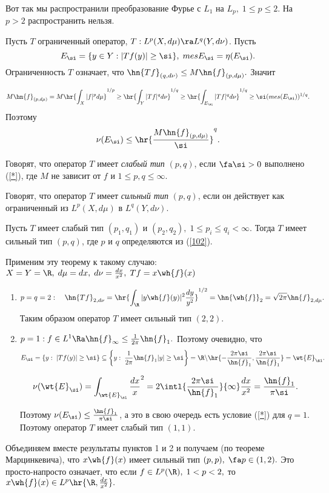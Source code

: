 \documentclass[a4paper]{article}
\begin{document}
Вот так мы распространили преобразование Фурье с $L_1$ на $L_p,\;1\le p \le 2$. На $p>2$ распространить
нельзя.

Пусть $T$ ограниченный оператор, $T:L^p(X,d\mu)\ra L^q(Y,d\nu)$. Пусть
$$E_{\si}=\{y\in Y:|Tf(y)|\ge\si\},\;mes E_{\si}=\eta(E_{\si}).$$ Ограниченность $T$ означает, что
$\hn{Tf}_{(q,d\nu)}\le M\hn{f}_{(p,d\mu)}.$ Значит

$$M\hn{f}_{(p,d\mu)}=M\hr{\int_X |f|^pd\mu}^{1/p}\ge \hr{\int_Y |Tf|^qd\nu}^{1/q}\ge
\hr{\int_{E_{\si}} |Tf|^qd\nu}^{1/q}\ge\si(mes(E_{\si}))^{1/q}.$$ Поэтому
\begin{equation}\label{*}
\nu(E_{\si})\le\hr{\frac{M\hn{f}_{(p,d\mu)}}{\si}}^q.
\end{equation}

\begin{df}
  Говорят, что оператор $T$ имеет \emph{слабый тип} $(p,q)$, если $\fa\si>0$
  выполнено (\ref{*}), где $M$ не зависит от $f$ и $1\le p,q\le\infty.$
\end{df}

\begin{df}
  Говорят, что оператор $T$ имеет \emph{сильный тип} $(p,q)$, если он действует как
  ограниченный из $L^p(X,d\mu)$ в $L^q(Y,d\nu).$
\end{df}

\begin{theorem}[Марцинкевич] Пусть $T$ имеет слабый тип
$(p_1,q_1)$ и $(p_2,q_2),\;1\le p_i\le q_i<\infty$. Тогда $T$ имеет сильный тип $(p,q)$, где $p$ и $q$
определяются из (\ref{102}).
\end{theorem}

Применим эту теорему к такому случаю: $X=Y=\R ,\;d\mu=dx,\;d\nu=\frac{dx}{x^2},\;Tf=x\wh{f}(x)$
\begin{enumerate}
\item
$$p=q=2:\quad\hn{Tf}_{2,d\nu}=\hr{\int_{\R }|y\wh{f}(y)|^2\frac{dy}{y^2}}^{1/2}=\hn{\wh{f}}_2=\sqrt{2\pi}\hn{f}_{2,d\mu}.$$
Таким образом оператор $T$ имеет сильный тип $(2,2).$
\item
$p=1: f\in L^1\Ra\hn{f}_{\infty}\le\frac1{2\pi}\hn{f}_1.$ Поэтому очевидно, что
$$E_{\si}=\{y:\;|Tf(y)|\ge\si\}\subseteq\left\{y:\;\frac1{2\pi}\hn{f}_1|y|\ge\si\right\}=\R \backslash\hr{-\frac{2\pi\si}{\hn{f}_1},\frac{2\pi\si}{\hn{f}_1}}=\wt{E}_{\si}.$$

$$\nu(\wt{E}_{\si})=\int_{\wt{E}_{\si}}\frac{dx}x^2=2\intl{\frac{2\pi\si}{\hn{f}_1}}{\infty}\frac{dx}{x^2}=\frac{\hn{f}_1}{\pi\si}.$$

Поэтому $\nu(E_{\si})\le\frac{\hn{f}_1}{\pi\si}$, а это в свою очередь есть условие (\ref{*}) для
$q=1.$ Поэтому оператор $T$ имеет слабый тип $(1,1).$
\end{enumerate}
Объединяем вместе результаты пунктов 1 и 2 и получаем (по теореме Марцинкевича), что $x\wh{f}(x)$ имеет
сильный тип $(p,p),\;\fa p\in(1,2).$ Это просто-напросто означает, что если $f\in
L^p(\R ),\;1<p<2,$ то $x\wh{f}(x)\in L^p\hr{\R ,\frac{dx}{x^2}}.$
\end{document}
